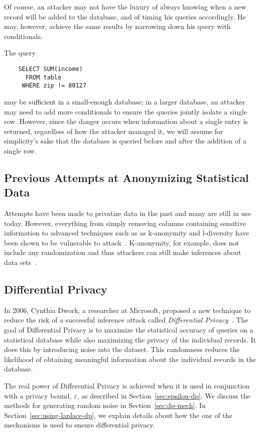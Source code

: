 \documentclass[conference,11pt]{IEEEtran}
\begin{document}
Of course, an attacker may not have the luxury of always knowing when a new
record will be added to the database, and of timing his queries accordingly. He
may, however, achieve the same results by narrowing down his query with
conditionals.

The query
\begin{verbatim}
    SELECT SUM(income)
      FROM table
     WHERE zip != 80127
\end{verbatim}
may be sufficient in a small-enough database; in a larger database, an attacker
may need to add more conditionals to ensure the queries jointly isolate a single
row.  However, since the danger occurs when information about a single entry is
returned, regardless of how the attacker managed it, we will assume for
simplicity's sake that the database is queried before and after the addition of
a single row.

\subsection{Previous Attempts at Anonymizing Statistical Data}
Attempts have been made to privatize data in the past and many are still in use
today. However, everything from simply removing columns containing sensitive
information to advanced techniques such as as k-anonymity and l-diversity have
been shown to be vulnerable to attack~\cite{Atockar:2014}.  K-anonymity, for
example, does not include any randomization and thus attackers can still make
inferences about data sets~\cite{Aggarwal:2005}.

\subsection{Differential Privacy}
In 2006, Cynthia Dwork, a researcher at Microsoft, proposed a new technique to
reduce the risk of a successful inference attack called \textit{Differential
Privacy}~\cite{Hilton:DP:history}. The goal of Differential Privacy is to
maximize the statistical accuracy of queries on a statistical database while
also maximizing the privacy of the individual records. It does this by
introducing noise into the dataset. This randomness reduces the likelihood of
obtaining meaningful information about the individual records in the database.

The real power of Differential Privacy is achieved when it is used in
conjunction with a privacy bound, $\varepsilon$, as described in
Section~\ref{sec:epsilon-dp}. We discuss the methods for generating random noise
in Section~\ref{sec:dp-mech}. In Section~\ref{sec:using-laplace-dp}, we explain
details about how the one of the mechanisms is used to ensure differential
privacy.
\end{document}
